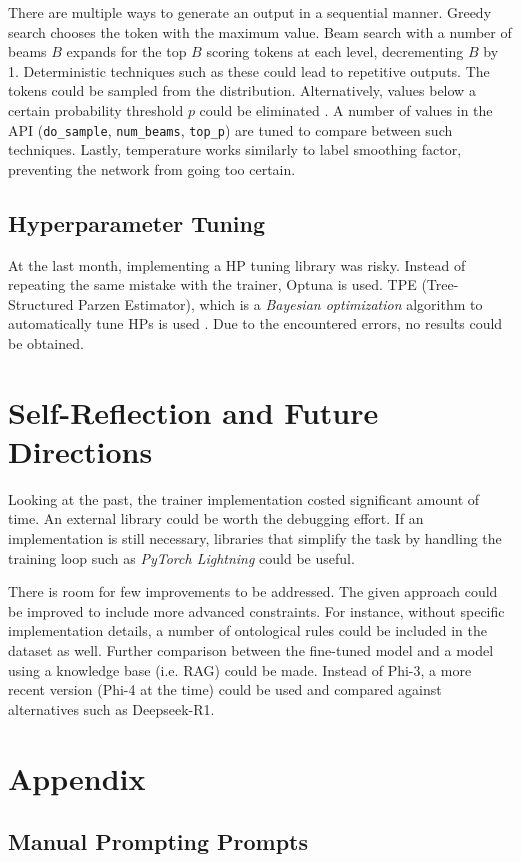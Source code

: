 \documentclass{article}
\begin{document}
There are multiple ways to generate an output in a sequential manner. Greedy search chooses the token with the maximum value. Beam search with a number of beams $B$ expands for the top $B$ scoring tokens at each level, decrementing $B$ by 1. Deterministic techniques such as these could lead to repetitive outputs. The tokens could be sampled from the distribution. Alternatively, values below a certain probability threshold $p$ could be eliminated \cite{holtzman_curious_2020}. A number of values in the API (\texttt{do\_sample}, \texttt{num\_beams}, \texttt{top\_p}) are tuned to compare between such techniques. Lastly, temperature works similarly to label smoothing factor, preventing the network from going too certain.
\subsection{Hyperparameter Tuning}
At the last month, implementing a HP tuning library was risky. Instead of repeating the same mistake with the trainer, Optuna is used. TPE (Tree-Structured Parzen Estimator), which is a \textit{Bayesian optimization} algorithm to automatically tune HPs is used \cite{watanabe_tree-structured_2023}. Due to the encountered errors, no results could be obtained.
\section{Self-Reflection and Future Directions}

Looking at the past, the trainer implementation costed significant amount of time. An external library could be worth the debugging effort. If an implementation is still necessary, libraries that simplify the task by handling the training loop such as \textit{PyTorch Lightning} could be useful.

There is room for few improvements to be addressed. The given approach could be improved to include more advanced constraints. For instance, without specific implementation details, a number of ontological rules could be included in the dataset as well. Further comparison between the fine-tuned model and a model using a knowledge base (i.e. RAG) could be made. Instead of Phi-3, a more recent version (Phi-4 at the time) could be used and compared against alternatives such as Deepseek-R1.

\section{Appendix}
\subsection{Manual Prompting Prompts \label{man_prompts}}
\end{document}
